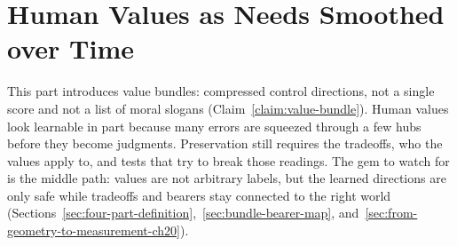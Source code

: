 \part{Human Values as Needs Smoothed over Time}

This part introduces value bundles: compressed control directions, not a single score and not a list of moral slogans (Claim~\ref{claim:value-bundle}).
Human values look learnable in part because many errors are squeezed through a few hubs before they become judgments.
Preservation still requires the tradeoffs, who the values apply to, and tests that try to break those readings.
The gem to watch for is the middle path: values are not arbitrary labels, but the learned directions are only safe while tradeoffs and bearers stay connected to the right world (Sections~\ref{sec:four-part-definition},~\ref{sec:bundle-bearer-map}, and~\ref{sec:from-geometry-to-measurement-ch20}).







